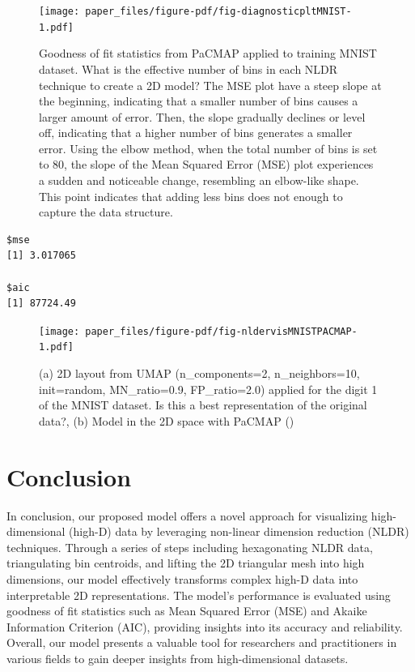\documentclass[
  12pt]{article}
\begin{document}
\begin{figure}

{\centering \texttt{[image: paper\_files/figure-pdf/fig-diagnosticpltMNIST-1.pdf]}

}

\caption{\label{fig-diagnosticpltMNIST}Goodness of fit statistics from
PaCMAP applied to training MNIST dataset. What is the effective number
of bins in each NLDR technique to create a 2D model? The MSE plot have a
steep slope at the beginning, indicating that a smaller number of bins
causes a larger amount of error. Then, the slope gradually declines or
level off, indicating that a higher number of bins generates a smaller
error. Using the elbow method, when the total number of bins is set to
80, the slope of the Mean Squared Error (MSE) plot experiences a sudden
and noticeable change, resembling an elbow-like shape. This point
indicates that adding less bins does not enough to capture the data
structure.}

\end{figure}

\begin{verbatim}
$mse
[1] 3.017065

$aic
[1] 87724.49
\end{verbatim}

\begin{figure}[h]

{\centering \texttt{[image: paper\_files/figure-pdf/fig-nldervisMNISTPACMAP-1.pdf]}

}

\caption{\label{fig-nldervisMNISTPACMAP}(a) 2D layout from UMAP
(n\_components=2, n\_neighbors=10, init=random, MN\_ratio=0.9,
FP\_ratio=2.0) applied for the digit 1 of the MNIST dataset. Is this a
best representation of the original data?, (b) Model in the 2D space
with PaCMAP ()}

\end{figure}

\hypertarget{sec-conclusion}{%
\section{Conclusion}\label{sec-conclusion}}

In conclusion, our proposed model offers a novel approach for
visualizing high-dimensional (high-D) data by leveraging non-linear
dimension reduction (NLDR) techniques. Through a series of steps
including hexagonating NLDR data, triangulating bin centroids, and
lifting the 2D triangular mesh into high dimensions, our model
effectively transforms complex high-D data into interpretable 2D
representations. The model's performance is evaluated using goodness of
fit statistics such as Mean Squared Error (MSE) and Akaike Information
Criterion (AIC), providing insights into its accuracy and reliability.
Overall, our model presents a valuable tool for researchers and
practitioners in various fields to gain deeper insights from
high-dimensional datasets.
\end{document}
